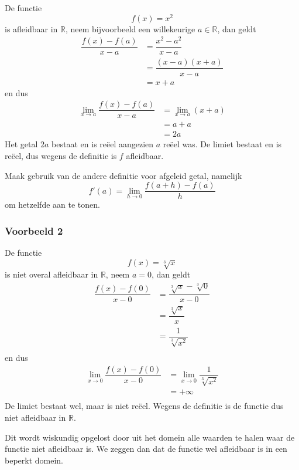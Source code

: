 \documentclass[a4paper,12pt,twoside]{article}
\begin{document}
De functie
$$f(x)=x^2$$
is afleidbaar in $\mathbb{R}$, neem bijvoorbeeld een willekeurige $a\in\mathbb{R}$, dan geldt
\begin{align*}
  \dfrac{f(x)-f(a)}{x-a} &= \dfrac{x^2-a^2}{x-a}\\
                         &= \dfrac{(x-a)(x+a)}{x-a}\\
                         &= x+a
\end{align*}
en dus
\begin{align*}
  \lim_{x\to a}\dfrac{f(x)-f(a)}{x-a} &= \lim_{x\to a}(x+a)\\
                                      &= a+a\\
                                      &= 2a
\end{align*}
Het getal $2a$ bestaat en is reëel aangezien $a$ reëel was. De limiet bestaat en is reëel, dus wegens de definitie is $f$ afleidbaar.

\begin{oefening}
  Maak gebruik van de andere definitie voor afgeleid getal, namelijk $$f'(a)=\lim_{h\to 0}\dfrac{f(a+h)-f(a)}{h}$$ om hetzelfde aan te tonen.
\end{oefening}

\subsubsection*{Voorbeeld 2}

De functie
$$f(x)=\sqrt[3]{x}$$
is niet overal afleidbaar in $\mathbb{R}$, neem $a=0$, dan geldt
\begin{align*}
  \dfrac{f(x)-f(0)}{x-0} &= \dfrac{\sqrt[3]{x}-\sqrt[3]{0}}{x-0}\\
                         &= \dfrac{\sqrt[3]{x}}{x}\\
                         &= \dfrac{1}{\sqrt[3]{x^2}}\\
\end{align*}
en dus
\begin{align*}
  \lim_{x\to 0}\dfrac{f(x)-f(0)}{x-0} &= \lim_{x\to 0}\dfrac{1}{\sqrt[3]{x^2}}\\
                                      &= +\infty\\
\end{align*}
De limiet bestaat wel, maar is niet reëel. Wegens de definitie is de functie dus niet afleidbaar in $\mathbb{R}$.

Dit wordt wiskundig opgelost door uit het domein alle waarden te halen waar de functie niet afleidbaar is. We zeggen dan dat de functie wel afleidbaar is in een beperkt domein.
\end{document}
